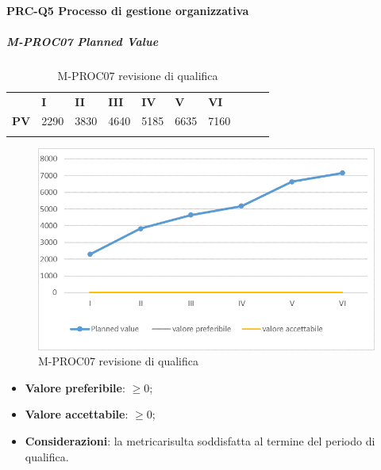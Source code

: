 \paragraph{PRC-Q5 Processo di gestione organizzativa}
\subparagraph{M-PROC07 Planned Value} \mbox{}
\begin{longtable}[H!] {						
		>{}p{50mm}  		
		>{}p{8mm}
		>{}p{8mm}		
		>{}p{8mm}		
		>{}p{8mm}		
		>{}p{8mm}		
		>{}p{8mm}
		>{}p{8mm}
		>{}p{8mm}
		>{}p{8mm}
	}
	\rowcolor{gray!50}
	\textbf{} & \textbf{I} & \textbf{II} & \textbf{III} & \textbf{IV} & \textbf{V} & \textbf{VI} \TBstrut \\ [2mm]
	\textbf{PV} & 2290 & 3830 & 4640 & 5185 & 6635 & 7160 \TBstrut \\ [2mm]
	\rowcolor{white}
	\caption{M-PROC07 revisione di qualifica}
\end{longtable}
\begin{figure}[H] 	
	\includegraphics[width=\linewidth]{./img/grafici/RQ7.png}	
	\caption{M-PROC07 revisione di qualifica}	
\end{figure}
\begin{itemize}
	\item \textbf{Valore preferibile}: $\ge0$;
	\item \textbf{Valore accettabile}: $\ge0$;
	\item \textbf{Considerazioni}: la metrica\glosp risulta soddisfatta al termine del periodo di qualifica.
\end{itemize}

